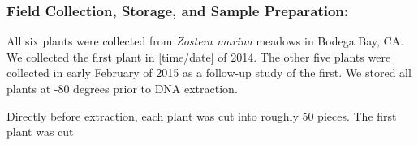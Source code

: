 
\subsubsection{Field Collection, Storage, and Sample Preparation:}

All six plants were collected from \textit{Zostera marina} meadows in Bodega Bay, CA. We collected the first plant in [time/date] of 2014. The other five plants were collected in early February of 2015 as a follow-up study of the first. We stored all plants at -80 degrees prior to DNA extraction. 

Directly before extraction, each plant was cut into roughly 50 pieces. The first plant was cut     

    
    
